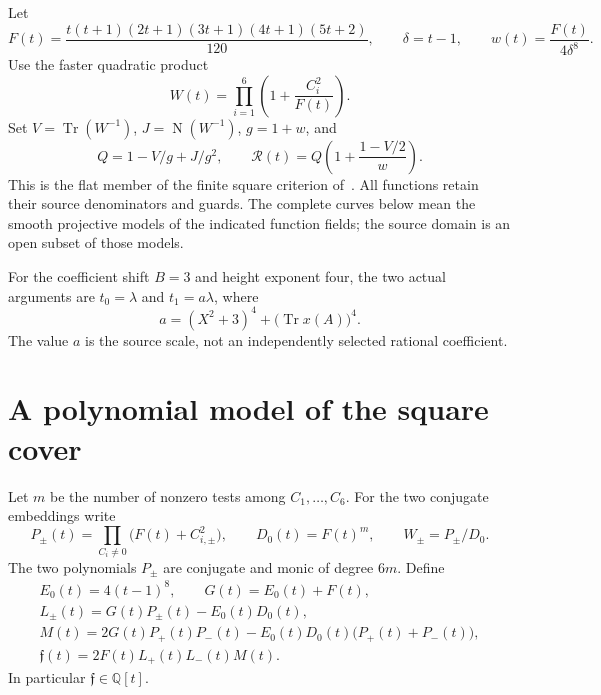 \documentclass[11pt,a4paper]{article}
\newcommand{\Q}{\mathbb Q}
\DeclareMathOperator{\Tr}{Tr}\DeclareMathOperator{\Nm}{N}
\begin{document}
Let
\begin{equation}\label{eq:F}
 F(t)=\frac{t(t+1)(2t+1)(3t+1)(4t+1)(5t+2)}{120},\qquad
 \delta=t-1,\qquad w(t)=\frac{F(t)}{4\delta^8}.
\end{equation}
Use the faster quadratic product
\begin{equation}\label{eq:product}
                    W(t)=\prod_{i=1}^{6}\left(1+\frac{C_i^2}{F(t)}\right).
\end{equation}
Set $V=\Tr(W^{-1})$, $J=\Nm(W^{-1})$, $g=1+w$, and
\begin{equation}\label{eq:criterion}
 Q=1-V/g+J/g^2,\qquad
 \mathcal R(t)=Q\left(1+\frac{1-V/2}{w}\right).
\end{equation}
This is the flat member of the finite square criterion
of~\cite{Criterion}. All functions retain their source denominators
and guards. The complete curves below mean the smooth projective
models of the indicated function fields; the source domain is an
open subset of those models.

For the coefficient shift $B=3$ and height exponent four, the two
actual arguments are $t_0=\lambda$ and $t_1=a\lambda$, where
\begin{equation}\label{eq:scale}
                     a=(X^2+3)^4+\bigl(\Tr x(A)\bigr)^4.
\end{equation}
The value $a$ is the source scale, not an independently selected
rational coefficient.

\section{A polynomial model of the square cover}
Let $m$ be the number of nonzero tests among $C_1,\ldots,C_6$.
For the two conjugate embeddings write
\[
 P_\pm(t)=\prod_{C_i\ne0}\bigl(F(t)+C_{i,\pm}^2\bigr),\qquad
 D_0(t)=F(t)^m,\qquad W_\pm=P_\pm/D_0.
\]
The two polynomials $P_\pm$ are conjugate and monic of degree $6m$.
Define
\begin{equation}\label{eq:branchpolynomials}
\begin{gathered}
 E_0(t)=4(t-1)^8,\qquad G(t)=E_0(t)+F(t),\\
 L_\pm(t)=G(t)P_\pm(t)-E_0(t)D_0(t),\\
 M(t)=2G(t)P_+(t)P_-(t)
             -E_0(t)D_0(t)\bigl(P_+(t)+P_-(t)\bigr),\\
                       \mathfrak f(t)=2F(t)L_+(t)L_-(t)M(t).
\end{gathered}
\end{equation}
In particular $\mathfrak f\in\Q[t]$.
\end{document}
